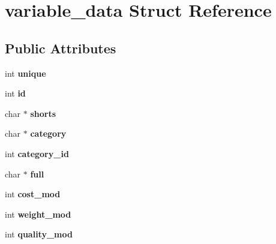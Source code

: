 \hypertarget{structvariable__data}{\section{variable\-\_\-data Struct Reference}
\label{structvariable__data}
}
\subsection*{Public Attributes}
\begin{DoxyCompactItemize}
\item 
\hypertarget{structvariable__data_af1e6b936a79f29767c0b62cbbacf9edd}{int {\bfseries unique}}\label{structvariable__data_af1e6b936a79f29767c0b62cbbacf9edd}

\item 
\hypertarget{structvariable__data_a336547d8889d3d3c7a2d8bf044842277}{int {\bfseries id}}\label{structvariable__data_a336547d8889d3d3c7a2d8bf044842277}

\item 
\hypertarget{structvariable__data_aece5a6cc4d302d0e2d5ad87a44b361b9}{char $\ast$ {\bfseries shorts}}\label{structvariable__data_aece5a6cc4d302d0e2d5ad87a44b361b9}

\item 
\hypertarget{structvariable__data_a80a0b8817711b353549e57af72de7d33}{char $\ast$ {\bfseries category}}\label{structvariable__data_a80a0b8817711b353549e57af72de7d33}

\item 
\hypertarget{structvariable__data_a41c5360735e2d8d2d96d42f51f36b69a}{int {\bfseries category\-\_\-id}}\label{structvariable__data_a41c5360735e2d8d2d96d42f51f36b69a}

\item 
\hypertarget{structvariable__data_a693c289b0689d96daee190ba499d0ba2}{char $\ast$ {\bfseries full}}\label{structvariable__data_a693c289b0689d96daee190ba499d0ba2}

\item 
\hypertarget{structvariable__data_a16a698aa7f17efec1278a55da18f80f8}{int {\bfseries cost\-\_\-mod}}\label{structvariable__data_a16a698aa7f17efec1278a55da18f80f8}

\item 
\hypertarget{structvariable__data_ad0f0fa6e7ac8209718c821e5473cc7b9}{int {\bfseries weight\-\_\-mod}}\label{structvariable__data_ad0f0fa6e7ac8209718c821e5473cc7b9}

\item 
\hypertarget{structvariable__data_a248d52aab03e7f8147843f1ae1010016}{int {\bfseries quality\-\_\-mod}}\label{structvariable__data_a248d52aab03e7f8147843f1ae1010016}


\end{DoxyCompactItemize}
